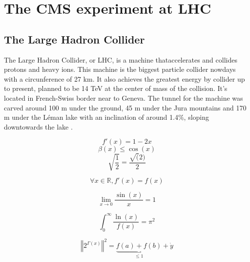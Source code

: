 \chapter{The CMS experiment at LHC}

\section{The Large Hadron Collider}
\label{sec:LHC}

The Large Hadron Collider, or LHC, is a machine thataccelerates and collides protons and heavy ions. This machine is the biggest particle collider nowdays with a circunference of 27 km. It also achieves the greatest energy by collider up to present, planned to be 14 TeV at the center of mass of the collision. It's located in French-Swiss border near to Geneva. The tunnel for the machine was carved around 100 m under the ground, 45 m under the Jura mountains and 170 m under the L\'{e}man lake with an inclination of around 1.4\%, sloping downtowards the lake .

\[ f'(x) = 1-2x \]
\[ \beta(x) \leq \cos(x) \]
\[ \sqrt{\frac{1}{2}}=\frac{\sqrt(2)}{2} \]

\begin{equation}
\forall x \in \mathbb{R}, f'(x)=f(x)
\end{equation}

\begin{equation}
\lim_{x\to 0}\frac{\sin(x)}{x}=1
\end{equation}

\begin{equation}
\int_{0}^{\infty}\frac{\ln(x)}{f(x)}=\pi^2
\end{equation}

\begin{equation*}
\left\Vert 2^{\Gamma(x)} \right\Vert^{2} = \underbrace{f(a)+f(b)}_{\leq 1}+\dot{y}
\end{equation*}
